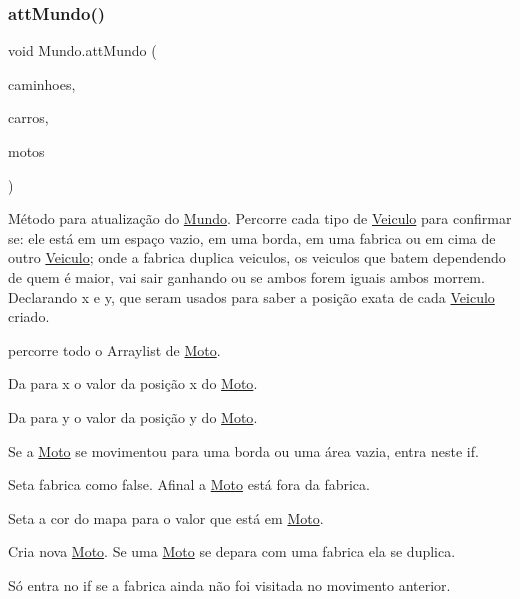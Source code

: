 \subsubsection{\texorpdfstring{att\+Mundo()}{attMundo()}}
{\footnotesize\ttfamily void Mundo.\+att\+Mundo (\begin{DoxyParamCaption}\item[{Array\+List$<$ \mbox{\hyperlink{class_caminhao}{Caminhao}} $>$}]{caminhoes,  }\item[{Array\+List$<$ \mbox{\hyperlink{class_carro}{Carro}} $>$}]{carros,  }\item[{Array\+List$<$ \mbox{\hyperlink{class_moto}{Moto}} $>$}]{motos }\end{DoxyParamCaption})\hspace{0.3cm}{\ttfamily [inline]}}

Método para atualização do \mbox{\hyperlink{class_mundo}{Mundo}}. Percorre cada tipo de \mbox{\hyperlink{class_veiculo}{Veiculo}} para confirmar se\+: ele está em um espaço vazio, em uma borda, em uma fabrica ou em cima de outro \mbox{\hyperlink{class_veiculo}{Veiculo}}; onde a fabrica duplica veiculos, os veiculos que batem dependendo de quem é \textquotesingle{}maior\textquotesingle{}, vai sair ganhando ou se ambos forem iguais ambos \textquotesingle{}morrem\textquotesingle{}. Declarando x e y, que seram usados para saber a posição exata de cada \mbox{\hyperlink{class_veiculo}{Veiculo}} criado.

percorre todo o Arraylist de \mbox{\hyperlink{class_moto}{Moto}}.

Da para x o valor da posição x do \mbox{\hyperlink{class_moto}{Moto}}.

Da para y o valor da posição y do \mbox{\hyperlink{class_moto}{Moto}}.

Se a \mbox{\hyperlink{class_moto}{Moto}} se movimentou para uma borda ou uma área vazia, entra neste if.

Seta fabrica como false. Afinal a \mbox{\hyperlink{class_moto}{Moto}} está fora da fabrica.

Seta a cor do mapa para o valor que está em \mbox{\hyperlink{class_moto}{Moto}}.

Cria nova \mbox{\hyperlink{class_moto}{Moto}}. Se uma \mbox{\hyperlink{class_moto}{Moto}} se depara com uma fabrica ela se duplica.

Só entra no if se a fabrica ainda não foi visitada no movimento anterior.

